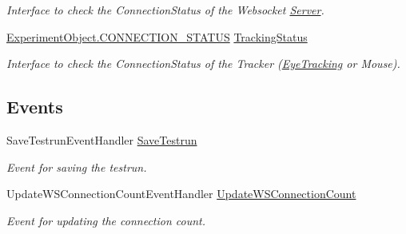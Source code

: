 \begin{DoxyCompactItemize}
\begin{DoxyCompactList}\small\item\em Interface to check the Connection\+Status of the Websocket \hyperlink{namespace_web_analyzer_1_1_server}{Server}. \end{DoxyCompactList}\item 
\hyperlink{class_web_analyzer_1_1_u_i_1_1_interaction_objects_1_1_experiment_object_a2875208b4f4b0ed643593152f4ec025c}{Experiment\+Object.\+C\+O\+N\+N\+E\+C\+T\+I\+O\+N\+\_\+\+S\+T\+A\+T\+U\+S} \hyperlink{class_web_analyzer_1_1_controller_1_1_test_controller_adc0db19e3cc5958f24dd5fd09ce34d98}{Tracking\+Status}
\begin{DoxyCompactList}\small\item\em Interface to check the Connection\+Status of the Tracker (\hyperlink{namespace_web_analyzer_1_1_eye_tracking}{Eye\+Tracking} or Mouse). \end{DoxyCompactList}\end{DoxyCompactItemize}
\subsection*{Events}
\begin{DoxyCompactItemize}
\item 
Save\+Testrun\+Event\+Handler \hyperlink{class_web_analyzer_1_1_controller_1_1_test_controller_a45f8340dcea78391a3f58e5c7996d126}{Save\+Testrun}
\begin{DoxyCompactList}\small\item\em Event for saving the testrun. \end{DoxyCompactList}\item 
Update\+W\+S\+Connection\+Count\+Event\+Handler \hyperlink{class_web_analyzer_1_1_controller_1_1_test_controller_a3b6d28efa43ed99a2bdf0db062ba46e1}{Update\+W\+S\+Connection\+Count}
\begin{DoxyCompactList}\small\item\em Event for updating the connection count. \end{DoxyCompactList}\end{DoxyCompactItemize}

